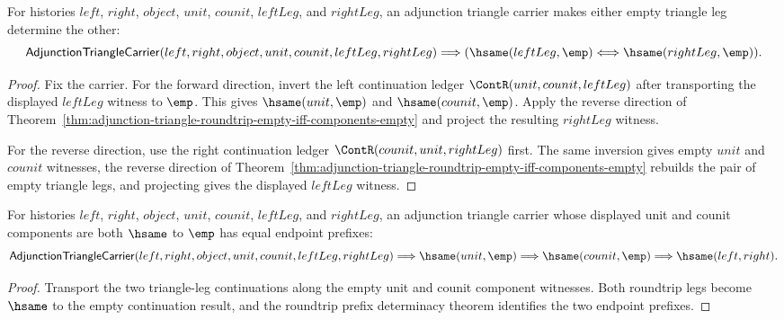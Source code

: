 \begin{theorem}
\label{thm:adjunction-triangle-single-leg-empty-iff}
For histories $left$, $right$, $object$, $unit$, $counit$, $leftLeg$, and
$rightLeg$, an adjunction triangle carrier makes either empty triangle leg
determine the other:
$$
\mathsf{AdjunctionTriangleCarrier}(left,right,object,unit,counit,leftLeg,rightLeg)
\Longrightarrow
(\hsame(leftLeg,\emp)\Longleftrightarrow\hsame(rightLeg,\emp)).
$$
\end{theorem}
\begin{proof}
Fix the carrier. For the forward direction, invert the left continuation
ledger $\ContR(unit,counit,leftLeg)$ after transporting the displayed
$leftLeg$ witness to $\emp$. This gives $\hsame(unit,\emp)$ and
$\hsame(counit,\emp)$. Apply the reverse direction of
Theorem~\ref{thm:adjunction-triangle-roundtrip-empty-iff-components-empty} and
project the resulting $rightLeg$ witness.

For the reverse direction, use the right continuation ledger
$\ContR(counit,unit,rightLeg)$ first. The same inversion gives empty $unit$
and $counit$ witnesses, the reverse direction of
Theorem~\ref{thm:adjunction-triangle-roundtrip-empty-iff-components-empty}
rebuilds the pair of empty triangle legs, and projecting gives the displayed
$leftLeg$ witness.
\end{proof}

\begin{theorem}
\label{thm:adjunction-triangle-components-empty-prefix-deterministic}
For histories $left$, $right$, $object$, $unit$, $counit$, $leftLeg$, and
$rightLeg$, an adjunction triangle carrier whose displayed unit and counit
components are both $\hsame$ to $\emp$ has equal endpoint prefixes:
$$
\mathsf{AdjunctionTriangleCarrier}(left,right,object,unit,counit,leftLeg,rightLeg)
\Longrightarrow
\hsame(unit,\emp)
\Longrightarrow
\hsame(counit,\emp)
\Longrightarrow
\hsame(left,right).
$$
\end{theorem}
\begin{proof}
Transport the two triangle-leg continuations along the empty unit and counit
component witnesses. Both roundtrip legs become $\hsame$ to the empty
continuation result, and the roundtrip prefix determinacy theorem identifies
the two endpoint prefixes.
\end{proof}

